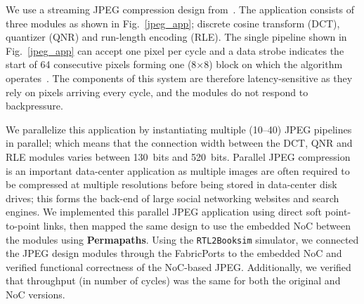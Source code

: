 %
%

%
%

We use a streaming JPEG compression design from~\cite{jpeg_opencore}.
The application consists of three modules as shown in Fig.~\ref{jpeg_app}; discrete cosine transform (DCT), quantizer (QNR) and run-length encoding (RLE).
The single pipeline shown in Fig.~\ref{jpeg_app} can accept one pixel per cycle and a data strobe indicates the start of 64 consecutive pixels forming one (8$\times$8) block on which the algorithm operates~\cite{jpeg_opencore}.
The components of this system are therefore latency-sensitive as they rely on pixels arriving every cycle, and the modules do not respond to backpressure.

We parallelize this application by instantiating multiple (10--40) JPEG pipelines in parallel; which means that the connection width between the DCT, QNR and RLE modules varies between 130~bits and 520~bits.
Parallel JPEG compression is an important data-center application as multiple images are often required to be compressed at multiple resolutions before being stored in data-center disk drives; this forms the back-end of large social networking websites and search engines.
We implemented this parallel JPEG application using direct soft point-to-point links, then mapped the same design to use the embedded NoC between the modules using \textbf{Permapaths}.
Using the \texttt{RTL2Booksim} simulator, we connected the JPEG design modules through the FabricPorts to the embedded NoC and verified functional correctness of the NoC-based JPEG.
Additionally, we verified that throughput (in number of cycles) was the same for both the original and NoC versions.%

